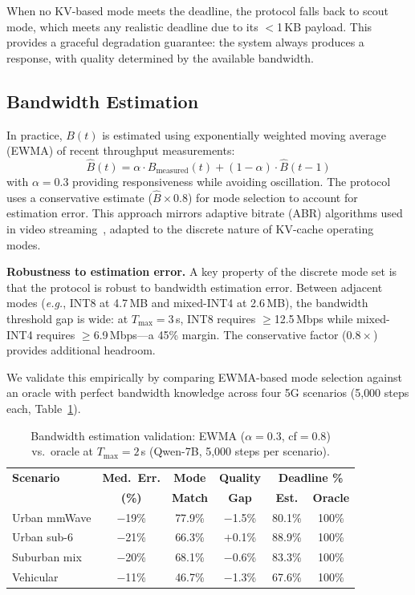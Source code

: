\documentclass[journal]{IEEEtran}
\newcommand{\eg}{\textit{e.g.}\xspace}
\begin{document}
When no KV-based mode meets the deadline, the protocol falls back to scout mode, which meets any realistic deadline due to its $<$1\,KB payload.
This provides a graceful degradation guarantee: the system always produces a response, with quality determined by the available bandwidth.

\subsection{Bandwidth Estimation}

In practice, $B(t)$ is estimated using exponentially weighted moving average (EWMA) of recent throughput measurements:
\begin{equation}
    \hat{B}(t) = \alpha \cdot B_{\text{measured}}(t) + (1 - \alpha) \cdot \hat{B}(t-1)
\end{equation}
with $\alpha = 0.3$ providing responsiveness while avoiding oscillation.
The protocol uses a conservative estimate ($\hat{B} \times 0.8$) for mode selection to account for estimation error.
This approach mirrors adaptive bitrate (ABR) algorithms used in video streaming~\cite{abr}, adapted to the discrete nature of KV-cache operating modes.

\textbf{Robustness to estimation error.}
A key property of the discrete mode set is that the protocol is robust to bandwidth estimation error.
Between adjacent modes (\eg, INT8 at 4.7\,MB and mixed-INT4 at 2.6\,MB), the bandwidth threshold gap is wide: at $T_{\max} = 3$\,s, INT8 requires $\geq$12.5\,Mbps while mixed-INT4 requires $\geq$6.9\,Mbps---a 45\% margin.
The conservative factor ($0.8\times$) provides additional headroom.

We validate this empirically by comparing EWMA-based mode selection against an oracle with perfect bandwidth knowledge across four 5G scenarios (5{,}000 steps each, Table~\ref{tab:bw_validation}).

\begin{table}[t]
\centering
\caption{Bandwidth estimation validation: EWMA ($\alpha\!=\!0.3$, cf$\!=\!0.8$) vs.\ oracle at $T_{\max} = 2$\,s (Qwen-7B, 5{,}000 steps per scenario).}
\label{tab:bw_validation}
\footnotesize
\begin{tabular}{@{}lccccc@{}}
\toprule
\textbf{Scenario} & \textbf{Med.\ Err.} & \textbf{Mode} & \textbf{Quality} & \multicolumn{2}{c}{\textbf{Deadline \%}} \\
                   & \textbf{(\%)} & \textbf{Match} & \textbf{Gap} & \textbf{Est.} & \textbf{Oracle} \\
\midrule
Urban mmWave  & $-$19\%  & 77.9\% & $-$1.5\% & 80.1\% & 100\% \\
Urban sub-6   & $-$21\%  & 66.3\% & $+$0.1\% & 88.9\% & 100\% \\
Suburban mix  & $-$20\%  & 68.1\% & $-$0.6\% & 83.3\% & 100\% \\
Vehicular     & $-$11\%  & 46.7\% & $-$1.3\% & 67.6\% & 100\% \\
\bottomrule
\end{tabular}
\end{table}
\end{document}
